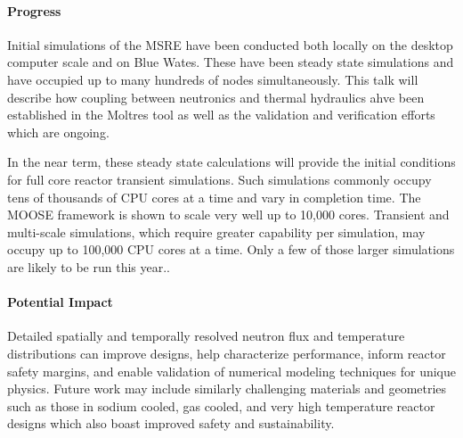 \documentclass[11pt]{article}
\begin{document}
\paragraph{Progress}

Initial simulations of the MSRE have been conducted both locally on the desktop 
computer scale and on Blue Wates. These have been steady state simulations and 
have occupied up to many hundreds of nodes simultaneously. This talk will 
describe how coupling between neutronics and thermal hydraulics ahve been 
established in the Moltres tool as well as the validation and verification 
efforts which are ongoing.  

In the near term, these steady state calculations will provide the initial 
conditions for full core reactor transient simulations. Such simulations 
commonly occupy tens of thousands of CPU cores at a time and vary in completion 
time. The MOOSE framework is shown to scale very well up to 10,000 cores. 
Transient and multi-scale simulations, which require greater capability per 
simulation, may occupy up to 100,000 CPU cores at a time. Only a few of those 
larger simulations are likely to be run this year..

\paragraph{Potential Impact}
Detailed spatially and temporally resolved neutron flux and
temperature distributions can improve designs, help characterize
performance, inform reactor safety margins, and enable validation of numerical
modeling techniques for unique physics.
Future work may include similarly challenging materials and geometries such as
those in sodium cooled, gas cooled, and very high temperature reactor designs
which also boast improved safety and sustainability.
\end{document}
